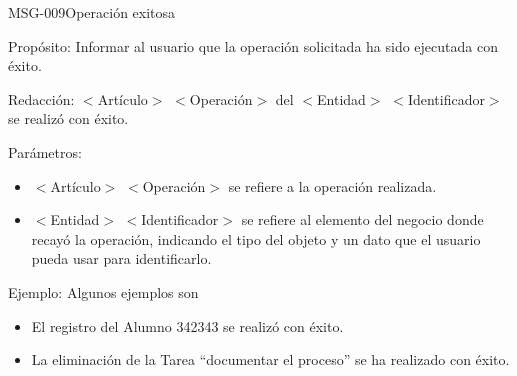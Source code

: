\begin{cdtMessage}[msgInfoColor]{MSG-009}{Operación exitosa}
	\item[Propósito:] Informar al usuario que la operación solicitada ha sido ejecutada con éxito.
	\item[Redacción:] $<$Artículo$>$ $<$Operación$>$ del $<$Entidad$>$ $<$Identificador$>$ se realizó con éxito.
	\item[Parámetros:]\hspace{1pt}
	\begin{itemize}
		\item $<$Artículo$>$ $<$Operación$>$ se refiere a la operación realizada.
		\item $<$Entidad$>$ $<$Identificador$>$ se refiere al elemento del negocio donde recayó la operación, indicando el tipo del objeto y un dato que el usuario pueda usar para identificarlo.
	\end{itemize}
	\item[Ejemplo:] Algunos ejemplos son
	\begin{itemize}
		\item El registro del Alumno 342343 se realizó con éxito.
		\item La eliminación de la Tarea ``documentar el proceso'' se ha realizado con éxito.
	\end{itemize}
\end{cdtMessage}